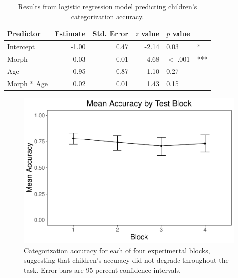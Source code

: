 \documentclass[,man,floatsintext]{apa6}
\begin{document}
\begin{table}[ht]
\centering
\caption{Results from logistic regression model predicting children's categorization accuracy.} 
\begin{tabular}{lrrrll}
  \hline
Predictor & Estimate & Std. Error & $z$ value & $p$ value &   \\ 
  \hline
Intercept & -1.00 & 0.47 & -2.14 & 0.03 & * \\ 
  Morph & 0.03 & 0.01 & 4.68 & $<$ .001 & *** \\ 
  Age & -0.95 & 0.87 & -1.10 & 0.27 &  \\ 
  Morph * Age & 0.02 & 0.01 & 1.43 & 0.15 &  \\ 
   \hline
\end{tabular}
\end{table}

\begin{figure}
\centering
\includegraphics{soc_ref_category_paper_files/figure-latex/blockaccuracy-1.pdf}
\caption{\label{fig:blockaccuracy}Categorization accuracy for each of four experimental blocks, suggesting that children's accuracy did not degrade throughout the task. Error bars are 95 percent confidence intervals.}
\end{figure}
\end{document}
